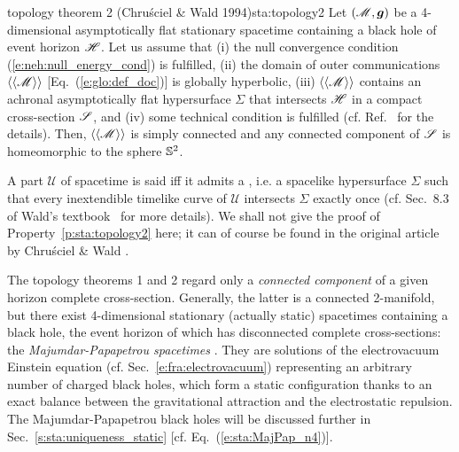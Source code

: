 \begin{tprop}{topology theorem 2 \textnormal{(Chru\'sciel \& Wald 1994)}}{sta:topology2}
Let $(\mathscr{M}, \bm{g})$ be a 4-dimensional asymptotically flat stationary spacetime
containing a black hole of event horizon $\mathscr{H}$.
Let us assume that (i) the
null convergence condition  (\ref{e:neh:null_energy_cond}) is fulfilled,
(ii) the domain of outer communications $\langle\langle \mathscr{M}\rangle\rangle$
[Eq.~(\ref{e:glo:def_doc})]
is globally hyperbolic,
(iii) $\langle\langle \mathscr{M}\rangle\rangle$ contains an achronal asymptotically
flat hypersurface $\Sigma$ that intersects $\mathscr{H}$ in a compact cross-section $\mathscr{S}$,
and (iv) some technical condition is fulfilled (cf. Ref.~\cite{ChrusW94b} for the details).
Then, $\langle\langle \mathscr{M}\rangle\rangle$ is simply connected and
any connected component of $\mathscr{S}$ is homeomorphic to the sphere $\mathbb{S}^2$.
\end{tprop}
A part $\mathscr{U}$ of spacetime is said
\label{d:sta:glob_hyperbol}
iff it admits a \label{d:sta:Cauchy_surface}, i.e. a spacelike
hypersurface $\Sigma$ such that every inextendible timelike curve of $\mathscr{U}$
intersects $\Sigma$ exactly once (cf. Sec.~8.3 of Wald's textbook~\cite{Wald84} for more
details). We shall not give the proof of Property~\ref{p:sta:topology2} here; it can of course
be found in the original article by Chru\'sciel \& Wald \cite{ChrusW94b}.

\begin{remark}
\label{r:sta:Majumdar_Papapetrou}
The topology theorems 1 and 2 regard only
a \emph{connected component} of a given horizon complete cross-section.
Generally, the latter is a connected 2-manifold, but there exist
4-dimensional stationary (actually static) spacetimes containing a black hole,
the event horizon of which has
disconnected complete cross-sections: the
\emph{Majumdar-Papapetrou spacetimes}
\cite{Majum47,Papap47,HartlH72}. They are solutions of the
electrovacuum Einstein equation (cf. Sec.~\ref{e:fra:electrovacuum})
representing an arbitrary number of charged black holes,
which form a static configuration thanks to
an exact balance between the gravitational
attraction and the electrostatic repulsion. The Majumdar-Papapetrou black holes will be discussed
further in Sec.~\ref{s:sta:uniqueness_static} [cf. Eq.~(\ref{e:sta:MajPap_n4})].
\end{remark}


